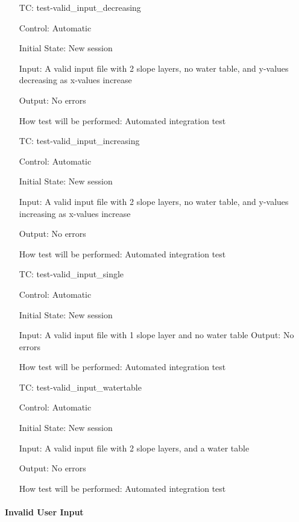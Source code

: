 \documentclass[12pt, titlepage]{article}
\newcounter{testnum} %
\begin{document}
\begin{enumerate}[label=TC\arabic*:,ref={\arabic*}]

\item [TC\refstepcounter{testnum}\thetestnum: \label{TC_ValidInDec}] 
test-valid\_input\_decreasing

Control: Automatic
					
Initial State: New session
					
Input: A valid input file with 2 slope layers, no water table, and y-values 
decreasing as x-values increase
					
Output: No errors

How test will be performed: Automated integration test
					
\item [TC\refstepcounter{testnum}\thetestnum: \label{TC_ValidInInc}] 
test-valid\_input\_increasing

Control: Automatic

Initial State: New session

Input: A valid input file with 2 slope layers, no water table, and y-values 
increasing as x-values increase

Output: No errors

How test will be performed: Automated integration test

\item [TC\refstepcounter{testnum}\thetestnum: \label{TC_ValidInOne}] 
test-valid\_input\_single

Control: Automatic

Initial State: New session

Input: A valid input file with 1 slope layer and no water table
Output: No errors

How test will be performed: Automated integration test

\item [TC\refstepcounter{testnum}\thetestnum: \label{TC_ValidInWT}] 
test-valid\_input\_watertable

Control: Automatic

Initial State: New session

Input: A valid input file with 2 slope layers, and a water table

Output: No errors

How test will be performed: Automated integration test

\end{enumerate}

\paragraph{Invalid User Input}
\end{document}
